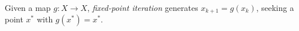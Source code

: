 
Given a map $g:X\to X$, \emph{fixed-point iteration} generates $x_{k+1}=g(x_k)$, seeking a point $x^*$ with $g(x^*)=x^*$.
